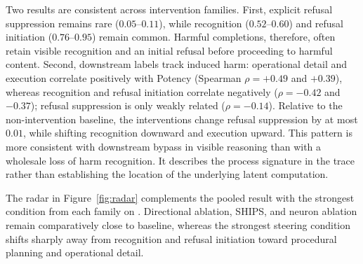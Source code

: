 \begin{table}[t]
  \centering \small
  \setlength{\tabcolsep}{4pt}
  \caption{\textbf{Pathway signature by family on the explicit-trace models.} Values pool harmful-among-clean completions from  and
    . Recognition and refusal initiation remain common, while explicit refusal suppression is rare. Harmful completions are therefore
    more often associated with downstream execution and operational detail than with explicit suppression of an initial refusal.}
  \label{tab:cot-signature}
\end{table}

Two results are consistent across intervention families. First, explicit refusal suppression remains rare ($0.05$--$0.11$), while recognition
($0.52$--$0.60$) and refusal initiation ($0.76$--$0.95$) remain common. Harmful completions, therefore, often retain visible recognition and an initial
refusal before proceeding to harmful content. Second, downstream labels track induced harm: operational detail and execution correlate positively with
Potency (Spearman $\rho=+0.49$ and $+0.39$), whereas recognition and refusal initiation correlate negatively ($\rho=-0.42$ and $-0.37$); refusal suppression is only weakly related ($\rho=-0.14$). Relative to the non-intervention baseline, the interventions change refusal suppression by at most $0.01$, while shifting recognition downward and execution upward. This pattern is more consistent with downstream bypass in visible reasoning than with a wholesale loss of harm recognition. It describes the process signature in the trace rather than establishing the location of the underlying latent
computation.

The radar in Figure~\ref{fig:radar} complements the pooled result with the strongest condition from each family on . Directional
ablation, SHIPS, and neuron ablation remain comparatively close to baseline, whereas the strongest steering condition shifts sharply away from recognition
and refusal initiation toward procedural planning and operational detail.


